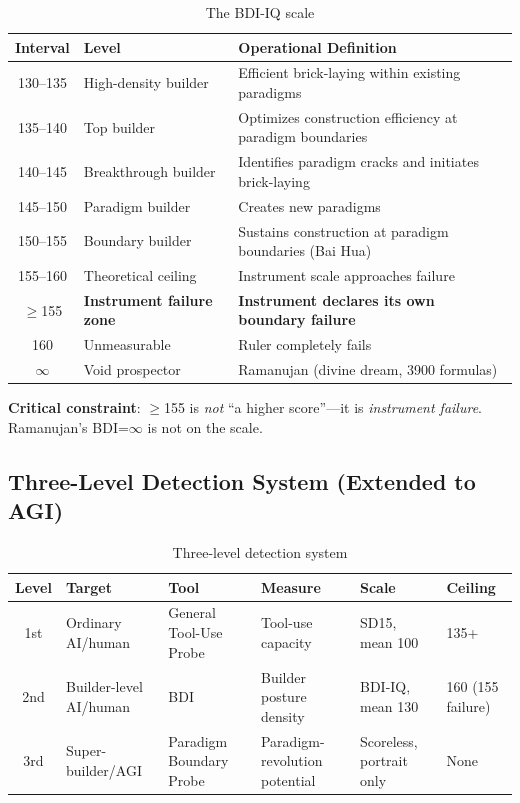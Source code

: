 \documentclass[11pt,a4paper]{article}
\theoremstyle{definition}
\theoremstyle{plain}
\newcommand{\BDI}{\textsc{BDI}}
\begin{document}
\begin{table}[htbp]
\centering
\caption{The \BDI{}-IQ scale}
\label{tab:scale}
\begin{tabular}{@{}cll@{}}
\toprule
\textbf{Interval} & \textbf{Level} & \textbf{Operational Definition} \\
\midrule
130--135 & High-density builder & Efficient brick-laying within existing paradigms \\
135--140 & Top builder & Optimizes construction efficiency at paradigm boundaries \\
140--145 & Breakthrough builder & Identifies paradigm cracks and initiates brick-laying \\
145--150 & Paradigm builder & Creates new paradigms \\
150--155 & Boundary builder & Sustains construction at paradigm boundaries (Bai Hua) \\
155--160 & Theoretical ceiling & Instrument scale approaches failure \\
$\geq$155 & \textbf{Instrument failure zone} & \textbf{Instrument declares its own boundary failure} \\
160 & Unmeasurable & Ruler completely fails \\
$\infty$ & Void prospector & Ramanujan (divine dream, 3900 formulas) \\
\bottomrule
\end{tabular}
\end{table}

\textbf{Critical constraint}: $\geq$155 is \textit{not} ``a higher score''---it is \textit{instrument failure}. Ramanujan's \BDI{}=$\infty$ is not on the scale.

\subsection{Three-Level Detection System (Extended to AGI)}

\begin{table}[htbp]
\centering
\caption{Three-level detection system}
\label{tab:three-level}
\begin{tabular}{@{}clllll@{}}
\toprule
\textbf{Level} & \textbf{Target} & \textbf{Tool} & \textbf{Measure} & \textbf{Scale} & \textbf{Ceiling} \\
\midrule
1st & Ordinary AI/human & General Tool-Use Probe & Tool-use capacity & SD15, mean 100 & 135+ \\
2nd & Builder-level AI/human & \BDI{} & Builder posture density & \BDI{}-IQ, mean 130 & 160 (155 failure) \\
3rd & Super-builder/AGI & Paradigm Boundary Probe & Paradigm-revolution potential & Scoreless, portrait only & None \\
\bottomrule
\end{tabular}
\end{table}
\end{document}
